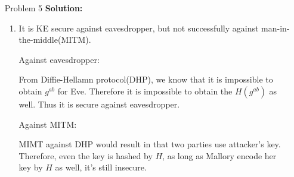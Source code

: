 \normalfont\documentclass[letterpaper,11pt]{article}
\begin{document}
\begin{enumerate}
\item [Problem 5]\textbf{Solution:}\par
	\begin{enumerate}
	\item It is KE secure against eavesdropper, but not successfully against man-in-the-middle(MITM). \par
	Against eavesdropper:\par
		From Diffie-Hellamn protocol(DHP), we know that it is impossible to obtain $g^{ab}$ for Eve. Therefore it is impossible to obtain the $H(g^{ab})$ as well. Thus it is secure against eavesdropper.\par
	Against MITM:\par
		MIMT against DHP would result in that two parties use attacker's key. Therefore, even the key is hashed by $H$, as long as Mallory encode her key by $H$ as well, it's still insecure. \par


\end{enumerate}
\end{enumerate}
\end{document}
